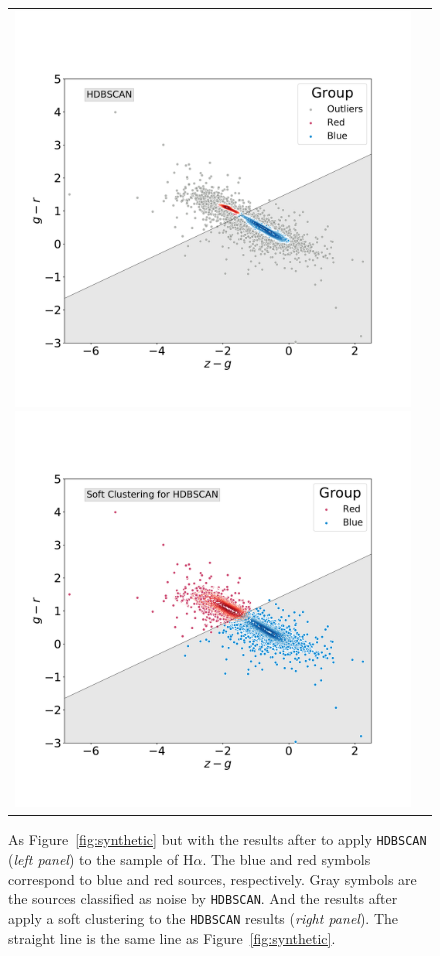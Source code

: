 \documentclass[fleqn,usenatbib]{mnras}
\begin{document}
\begin{figure}
\centering
\begin{tabular}{l l}
  \includegraphics[width=0.5\linewidth, trim=10 10 5 8, clip]{Figs/blued-red-hdbscan.pdf}
   \includegraphics[width=0.5\linewidth, trim=10 10 5 8, clip]{Figs/blue-red-hdbscan-soft-alternative.pdf}
  \end{tabular}  
  \caption{As Figure~\ref{fig:synthetic} but with the results after to apply \texttt{HDBSCAN} (\textit{left panel})
  to the sample of H{$\alpha$}. The blue and red symbols correspond to blue and red sources, respectively.
  Gray symbols are the sources classified as noise by \texttt{HDBSCAN}. And the results after apply a soft clustering 
  to the \texttt{HDBSCAN} results (\textit{right panel}). The straight line is the same line as Figure~\ref{fig:synthetic}.}
\label{fig:hdbscan}
\end{figure}
\end{document}
